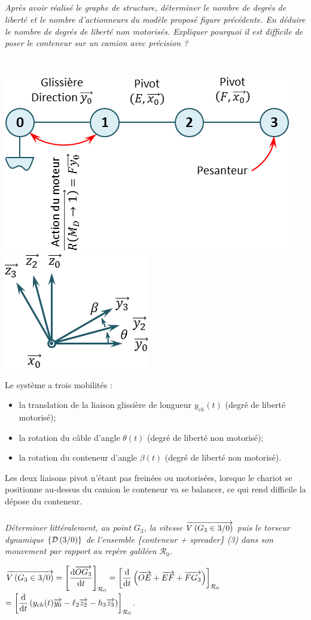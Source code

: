 \documentclass[10pt,fleqn]{article} %
\begin{document}
\begin{multicols}{2}
\subparagraph{}
\textit{Après avoir réalisé le graphe de structure, déterminer le nombre de degrés de liberté et le nombre d’actionneurs du modèle proposé figure précédente. En
déduire le nombre de degrés de liberté non motorisés. Expliquer pourquoi il est difficile de poser le conteneur
sur un camion avec précision ?}
\ifprof
\begin{corrige} ~\\

\begin{center}
\includegraphics[width=.5\linewidth]{images/cor_01}
\hfill
\includegraphics[width=.3\linewidth]{images/cor_02}
\end{center}

Le système a trois mobilités : 
\begin{itemize}
\item la translation de la liaison glissière de longueur $y_{ch}(t)$ (degré de liberté motorisé);
\item la rotation du câble d'angle $\theta(t)$ (degré de liberté non motorisé);
\item la rotation du conteneur d'angle $\beta(t)$ (degré de liberté non motorisé). 
\end{itemize}

Les deux liaisons pivot n'étant pas freinées ou motorisées, lorsque le chariot se positionne au-dessus du camion le conteneur va se balancer, ce qui rend difficile la dépose du conteneur. 

\end{corrige}
\else
\fi


\subparagraph{}
\textit{Déterminer littéralement, au point $G_3$, la vitesse $\overrightarrow{V\left( {G_3} \in {3}/{0}\right)}$ puis le torseur dynamique $\left\{\mathcal{D} \left(3/0 \right) \right\}$ de l’ensemble \{conteneur + spreader\} (3) dans son mouvement par rapport au repère galiléen $\mathcal{R}_0$.}
\ifprof
\begin{corrige}
$\overrightarrow{V\left( {G_3} \in {3}/{0}\right)}=   \left[\dfrac{\text{d} \overrightarrow{OG_3}}{\text{d} t}\right]_{\mathcal{R}_{0}}=   \left[\dfrac{\text{d} }{\text{d} t}\left(
\overrightarrow{OE}+\overrightarrow{EF}+\overrightarrow{FG_3} \right)\right]_{\mathcal{R}_{0}}$ 
$=   \left[\dfrac{\text{d} }{\text{d} t}\left(
y_{ch}(t) \overrightarrow{y_0}-\ell_2\overrightarrow{z_2}-h_3\overrightarrow{z_3} \right)\right]_{\mathcal{R}_{0}}$. 


\end{corrige}
\end{multicols}
\end{document}
